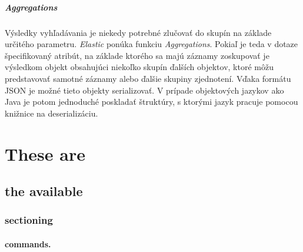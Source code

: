 \documentclass[
  digital, %
  table,   %
  lof,     %
  lot,     %
]{fithesis3}
\begin{document}
\paragraph{Aggregations}			
Výsledky vyhľadávania je niekedy potrebné zlučovať do skupín na základe určitého parametru. \textit{Elastic} ponúka funkciu \textit{Aggregations}. Pokiaľ je teda v dotaze špecifikovaný atribút, na základe ktorého sa majú záznamy zoskupovať je výsledkom objekt obsahujúci niekoľko skupín ďalších objektov, ktoré môžu predstavovať samotné záznamy alebo ďalšie skupiny zjednotení. Vďaka formátu JSON je možné tieto objekty serializovať. V prípade objektových jazykov ako Java je potom jednoduché poskladať štruktúry, s ktorými jazyk pracuje pomocou knižnice na deserializáciu.  


\chapter{These are}
\section{the available}
\subsection{sectioning}
\subsubsection{commands.}
\end{document}
